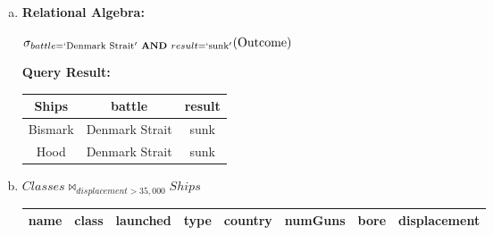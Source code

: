 \documentclass[12pt]{article}
\begin{document}
\begin{enumerate}
\begin{enumerate}[a)]
        \item

        \textbf{Relational Algebra:}

        \bigskip

        $\sigma_{battle=`\text{Denmark Strait}' \textbf{ AND } result=`\text{sunk}'}(\text{Outcome})$

        \bigskip

        \textbf{Query Result:}

        \bigskip

        \begin{tabular}{|c|c|c|}
            \hline
            Ships   &   battle  & result\\
            \hline
            Bismark &   Denmark Strait  & sunk\\
            \hline
            Hood    &   Denmark Strait  & sunk\\
            \hline
        \end{tabular}

        \item

        $Classes \bowtie_{displacement > 35,000} Ships$

        \bigskip

        \begin{tabular}{|c|c|c|c|c|c|c|c|}
            \hline
            name    &   class   &   launched    &   type    &   country &   numGuns   &   bore  &   displacement\\
            \hline

        \end{tabular}

    \end{enumerate}

\end{enumerate}
\end{document}
